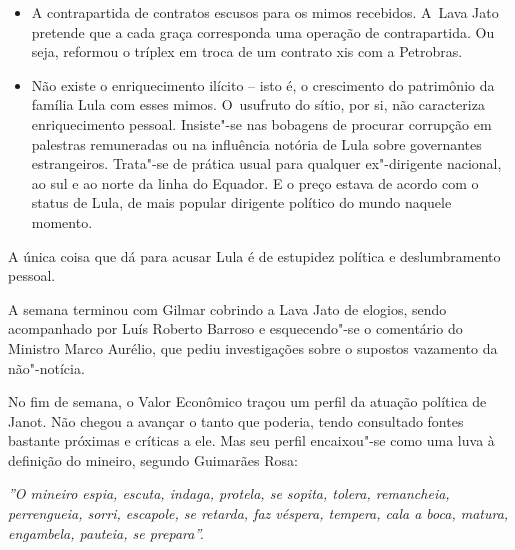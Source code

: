 \begin{itemize}
\itemsep1pt\parskip0pt
\item
  A contrapartida de contratos escusos para os mimos recebidos. A~Lava
  Jato pretende que a cada graça corresponda uma operação de
  contrapartida. Ou seja, reformou o tríplex em troca de um contrato xis
  com a Petrobras.
\item
  Não existe o enriquecimento ilícito -- isto é, o crescimento do
  patrimônio da família Lula com esses mimos. O~usufruto do sítio, por
  si, não caracteriza enriquecimento pessoal. Insiste"-se nas bobagens de
  procurar corrupção em palestras remuneradas ou na influência notória
  de Lula sobre governantes estrangeiros. Trata"-se de prática usual para
  qualquer ex"-dirigente nacional, ao sul e ao norte da linha do Equador.
  E o preço estava de acordo com o status de Lula, de mais popular
  dirigente político do mundo naquele momento.
\end{itemize}

A única coisa que dá para acusar Lula é de estupidez política e
deslumbramento pessoal.

A semana terminou com Gilmar cobrindo a Lava Jato de elogios, sendo
acompanhado por Luís Roberto Barroso e esquecendo"-se o comentário do
Ministro Marco Aurélio, que pediu investigações sobre o supostos
vazamento da não"-notícia.

No fim de semana, o Valor Econômico traçou um perfil da atuação política
de Janot. Não chegou a avançar o tanto que poderia, tendo consultado
fontes bastante próximas e críticas a ele. Mas seu perfil encaixou"-se
como uma luva à definição do mineiro, segundo Guimarães Rosa:

\emph{''O mineiro espia, escuta, indaga, protela, se sopita, tolera,
remancheia, perrengueia, sorri, escapole, se retarda, faz véspera,
tempera, cala a boca, matura, engambela, pauteia, se prepara''.}
